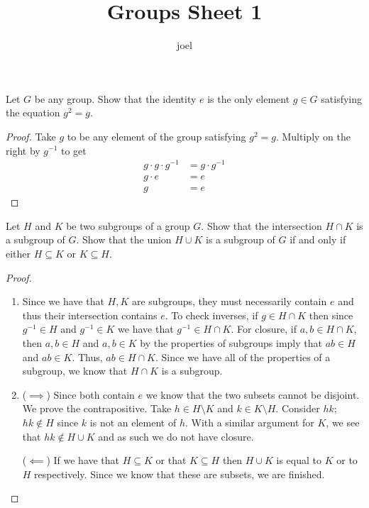 \documentclass[10pt]{article}
\title{Groups Sheet 1}
\author{joel}
\date{}
\theoremstyle{definition}
\theoremstyle{remark}
\begin{document}
\maketitle

Let $G$ be any group. Show that the identity $e$ is the only element $g \in G$
satisfying the equation $g^2 = g$.

\begin{proof}
    Take $g$ to be any element of the group satisfying $g^2 = g$. 
    Multiply on the right by $g^{-1}$ to get 
    \begin{align*}
        g \cdot g \cdot g^{-1} &= g \cdot g^{-1} \\ 
        g \cdot e &= e \\
        g &= e
    \end{align*}
\end{proof}

Let $H$ and $K$ be two subgroups of a group $G$. Show that the intersection $H
\cap K$ is a subgroup of $G$. Show that the union $H \cup K$ is a subgroup of $G$ if 
and only if either $H \subseteq K$ or $K \subseteq H$.

\begin{proof}
    \begin{enumerate}[label=(\roman*)]
        \item Since we have that $H, K$ are subgroups, they must necessarily contain $e$
            and thus their intersection contains $e$. To check inverses, if $g \in H
            \cap K$ then since $g^{-1} \in H$ and $g^{-1} \in K$ we have that $g^{-1}
            \in H \cap K$. For closure, if $a, b \in H \cap K$, then $a, b \in H$ and
            $a, b \in K$ by the properties of subgroups imply that $ab \in H$ and $ab
            \in K$. Thus, $ab \in H \cap K$. 
            Since we have all of the properties of a subgroup, we know that $H \cap K$ 
            is a subgroup. 

        \item ($\implies$) Since both contain $e$ we know that the two subsets
            cannot be disjoint. We prove the contrapositive.
            Take $h \in H \setminus K$ and $k \in K \setminus H$. Consider $hk$; 
            $hk \notin H$ since $k$ is not an element of $h$. With a similar 
            argument for $K$, we see that $hk \notin H \cup K$ and as such we 
            do not have closure. 

            ($\impliedby$) If we have that $H \subseteq K$ or that $K \subseteq H$
            then $H \cup K$ is equal to $K$ or to $H$ respectively. Since we 
            know that these are subsets, we are finished. 

    \end{enumerate} 
\end{proof}
\end{document}
